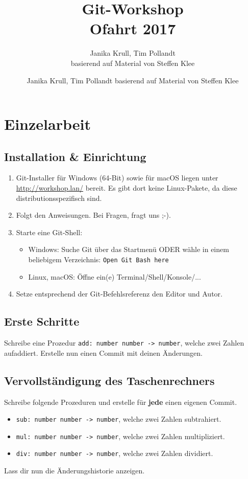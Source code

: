 \documentclass[accentcolor=tud8b,colorbacktitle,12pt]{tudexercise}
\author{Janika Krull, Tim Pollandt basierend auf Material von Steffen Klee}
\begin{document}
\title{Git-Workshop\\Ofahrt 2017}
\subtitle{Janika Krull, Tim Pollandt\\\tiny{basierend auf Material von Steffen Klee}}
\maketitle

\section{Einzelarbeit}
\setcounter{subsection}{-1}
\subsection{Installation \& Einrichtung}
\begin{enumerate}
	\item Git-Installer für Windows (64-Bit) sowie für macOS liegen unter \href{http://workshop.lan/}{http://workshop.lan/} bereit. Es gibt dort keine Linux-Pakete, da diese distributionsspezifisch sind.
	\item Folgt den Anweisungen. Bei Fragen, fragt uns ;-).
	\item Starte eine Git-Shell:
	\begin{itemize}
		\item Windows: Suche Git über das Startmenü ODER wähle in einem beliebigem Verzeichnis: \lstinline|Open Git Bash here|
		\item Linux, macOS: Öffne ein(e) Terminal/Shell/Konsole/...
	\end{itemize}
	\item Setze entsprechend der Git-Befehlsreferenz den Editor und Autor.
\end{enumerate}

\subsection{Erste Schritte}
Schreibe eine Prozedur \lstinline{add: number number -> number}, welche zwei Zahlen aufaddiert.
Erstelle nun einen Commit mit deinen Änderungen.

\subsection{Vervollständigung des Taschenrechners}
Schreibe folgende Prozeduren und erstelle für \textbf{jede} einen eigenen Commit.
\begin{itemize}
	\item \lstinline{sub: number number -> number}, welche zwei Zahlen subtrahiert.
	\item \lstinline{mul: number number -> number}, welche zwei Zahlen multipliziert.
	\item \lstinline{div: number number -> number}, welche zwei Zahlen dividiert.
\end{itemize}
Lass dir nun die Änderungshistorie anzeigen.
\end{document}

